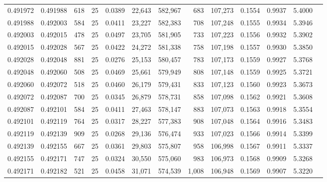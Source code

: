 \begin{tabular}{rrrrrrrrrrrrr}
0.491972 & 0.491988 &   618 &  25 &                                     0.0389 &  22,643 & 582,967 &     683 & 107,273 & 0.1554 & 0.9937 & 5.4000 \\
0.491988 & 0.492003 &   584 &  25 &                                     0.0411 &  23,227 & 582,383 &     708 & 107,248 & 0.1555 & 0.9934 & 5.3946 \\
0.492003 & 0.492015 &   478 &  25 &                                     0.0497 &  23,705 & 581,905 &     733 & 107,223 & 0.1556 & 0.9932 & 5.3902 \\
0.492015 & 0.492028 &   567 &  25 &                                     0.0422 &  24,272 & 581,338 &     758 & 107,198 & 0.1557 & 0.9930 & 5.3850 \\
0.492028 & 0.492048 &   881 &  25 &                                     0.0276 &  25,153 & 580,457 &     783 & 107,173 & 0.1559 & 0.9927 & 5.3768 \\
0.492048 & 0.492060 &   508 &  25 &                                     0.0469 &  25,661 & 579,949 &     808 & 107,148 & 0.1559 & 0.9925 & 5.3721 \\
0.492060 & 0.492072 &   518 &  25 &                                     0.0460 &  26,179 & 579,431 &     833 & 107,123 & 0.1560 & 0.9923 & 5.3673 \\
0.492072 & 0.492087 &   700 &  25 &                                     0.0345 &  26,879 & 578,731 &     858 & 107,098 & 0.1562 & 0.9921 & 5.3608 \\
0.492087 & 0.492101 &   584 &  25 &                                     0.0411 &  27,463 & 578,147 &     883 & 107,073 & 0.1563 & 0.9918 & 5.3554 \\
0.492101 & 0.492119 &   764 &  25 &                                     0.0317 &  28,227 & 577,383 &     908 & 107,048 & 0.1564 & 0.9916 & 5.3483 \\
0.492119 & 0.492139 &   909 &  25 &                                     0.0268 &  29,136 & 576,474 &     933 & 107,023 & 0.1566 & 0.9914 & 5.3399 \\
0.492139 & 0.492155 &   667 &  25 &                                     0.0361 &  29,803 & 575,807 &     958 & 106,998 & 0.1567 & 0.9911 & 5.3337 \\
0.492155 & 0.492171 &   747 &  25 &                                     0.0324 &  30,550 & 575,060 &     983 & 106,973 & 0.1568 & 0.9909 & 5.3268 \\
0.492171 & 0.492182 &   521 &  25 &                                     0.0458 &  31,071 & 574,539 &   1,008 & 106,948 & 0.1569 & 0.9907 & 5.3220 \\

\end{tabular}

